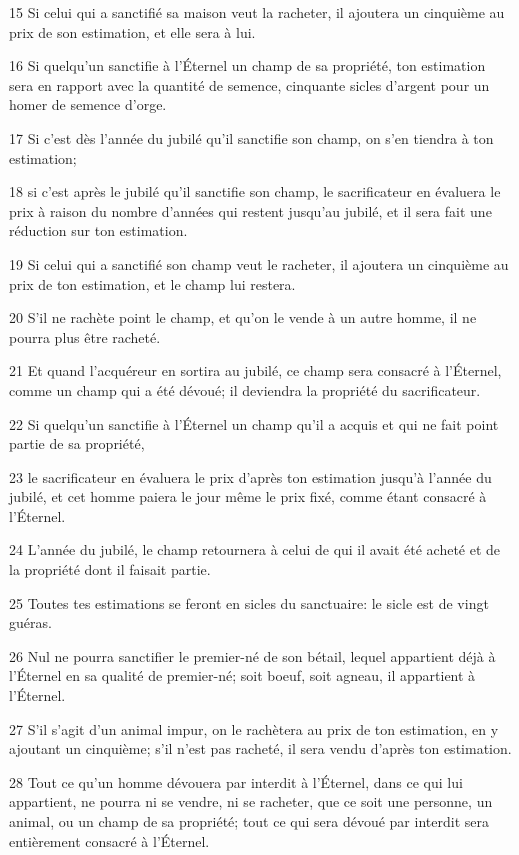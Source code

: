 \par 15 Si celui qui a sanctifié sa maison veut la racheter, il ajoutera un cinquième au prix de son estimation, et elle sera à lui.
\par 16 Si quelqu'un sanctifie à l'Éternel un champ de sa propriété, ton estimation sera en rapport avec la quantité de semence, cinquante sicles d'argent pour un homer de semence d'orge.
\par 17 Si c'est dès l'année du jubilé qu'il sanctifie son champ, on s'en tiendra à ton estimation;
\par 18 si c'est après le jubilé qu'il sanctifie son champ, le sacrificateur en évaluera le prix à raison du nombre d'années qui restent jusqu'au jubilé, et il sera fait une réduction sur ton estimation.
\par 19 Si celui qui a sanctifié son champ veut le racheter, il ajoutera un cinquième au prix de ton estimation, et le champ lui restera.
\par 20 S'il ne rachète point le champ, et qu'on le vende à un autre homme, il ne pourra plus être racheté.
\par 21 Et quand l'acquéreur en sortira au jubilé, ce champ sera consacré à l'Éternel, comme un champ qui a été dévoué; il deviendra la propriété du sacrificateur.
\par 22 Si quelqu'un sanctifie à l'Éternel un champ qu'il a acquis et qui ne fait point partie de sa propriété,
\par 23 le sacrificateur en évaluera le prix d'après ton estimation jusqu'à l'année du jubilé, et cet homme paiera le jour même le prix fixé, comme étant consacré à l'Éternel.
\par 24 L'année du jubilé, le champ retournera à celui de qui il avait été acheté et de la propriété dont il faisait partie.
\par 25 Toutes tes estimations se feront en sicles du sanctuaire: le sicle est de vingt guéras.
\par 26 Nul ne pourra sanctifier le premier-né de son bétail, lequel appartient déjà à l'Éternel en sa qualité de premier-né; soit boeuf, soit agneau, il appartient à l'Éternel.
\par 27 S'il s'agit d'un animal impur, on le rachètera au prix de ton estimation, en y ajoutant un cinquième; s'il n'est pas racheté, il sera vendu d'après ton estimation.
\par 28 Tout ce qu'un homme dévouera par interdit à l'Éternel, dans ce qui lui appartient, ne pourra ni se vendre, ni se racheter, que ce soit une personne, un animal, ou un champ de sa propriété; tout ce qui sera dévoué par interdit sera entièrement consacré à l'Éternel.
